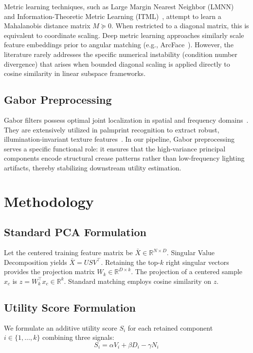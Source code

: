 \documentclass[conference]{IEEEtran}
\begin{document}
Metric learning techniques, such as Large Margin Nearest Neighbor (LMNN)~\cite{weinberger2009distance} and Information-Theoretic Metric Learning (ITML)~\cite{davis2007information}, attempt to learn a Mahalanobis distance matrix $M \succeq 0$. When restricted to a diagonal matrix, this is equivalent to coordinate scaling. Deep metric learning approaches similarly scale feature embeddings prior to angular matching (e.g., ArcFace~\cite{deng2019arcface}). However, the literature rarely addresses the specific numerical instability (condition number divergence) that arises when bounded diagonal scaling is applied directly to cosine similarity in linear subspace frameworks.

\subsection{Gabor Preprocessing}
Gabor filters possess optimal joint localization in spatial and frequency domains~\cite{daugman1985uncertainty}. They are extensively utilized in palmprint recognition to extract robust, illumination-invariant texture features~\cite{kong2009survey}. In our pipeline, Gabor preprocessing serves a specific functional role: it ensures that the high-variance principal components encode structural crease patterns rather than low-frequency lighting artifacts, thereby stabilizing downstream utility estimation.

\section{Methodology}
\label{sec:methodology}

\subsection{Standard PCA Formulation}
Let the centered training feature matrix be $\bar{X} \in \mathbb{R}^{N \times D}$. Singular Value Decomposition yields $\bar{X} = U S V^\top$. Retaining the top-$k$ right singular vectors provides the projection matrix $W_k \in \mathbb{R}^{D \times k}$. The projection of a centered sample $x_c$ is $z = W_k^\top x_c \in \mathbb{R}^k$. Standard matching employs cosine similarity on $z$.

\subsection{Utility Score Formulation}
We formulate an additive utility score $S_i$ for each retained component $i \in \{1, \ldots, k\}$ combining three signals:
\begin{equation}
    S_i = \alpha V_i + \beta D_i - \gamma N_i
    \label{eq:utility}
\end{equation}
\end{document}
